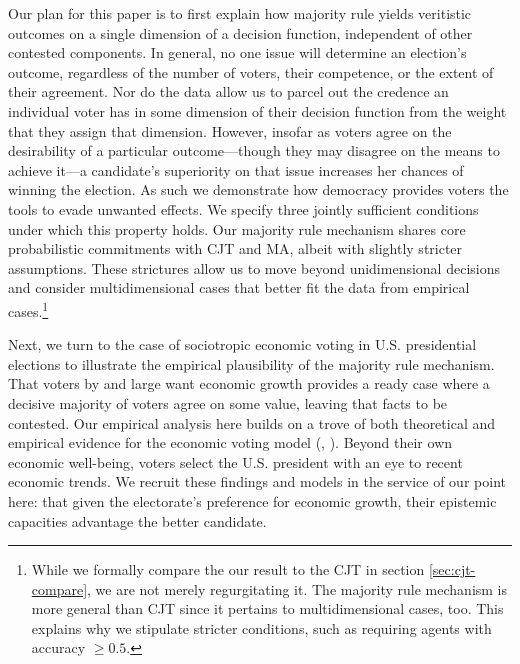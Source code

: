 \documentclass[11pt]{article}
\begin{document}
Our plan for this paper is to first explain how majority rule
yields veritistic outcomes on a single dimension of a decision
function, independent of other contested components.
In general, no one issue will determine an election's outcome, regardless of the number of voters, their competence, or the extent of their agreement. Nor do the data allow us to parcel out the credence an individual voter has in some dimension of their decision function from the weight that they assign that dimension. 
However, insofar as voters agree on the desirability of a particular outcome---though they may disagree on the means to achieve it---a candidate's superiority on that issue increases her chances of winning the election. As such we demonstrate how democracy provides voters the tools to evade unwanted effects. 
We specify three jointly sufficient conditions under which this property holds. 
Our majority rule mechanism shares  core probabilistic commitments with CJT and MA, albeit with slightly stricter assumptions. These strictures allow us to move beyond unidimensional decisions and consider multidimensional cases that better fit the data from empirical cases.\footnote{While we formally compare the our result to the CJT in section \ref{sec:cjt-compare}, we are not merely regurgitating it. The majority rule mechanism is more general than CJT since it pertains to multidimensional cases, too. This explains why we stipulate stricter conditions, such as requiring agents with accuracy $\ge 0.5$. }

Next, we turn to the case of sociotropic economic voting in U.S. presidential elections to illustrate the empirical plausibility of the majority rule mechanism. That voters by and large want economic growth provides a ready case where a decisive majority of voters agree on some value, leaving that facts to be contested.
 Our empirical analysis here builds on a trove of both theoretical and empirical evidence for the economic voting model (\cite{Duch2008}, \cite{Revisited09}). Beyond their own economic well-being, voters select the U.S. president with an eye to recent economic trends. We recruit these findings and models in the service of our point here: that given the electorate's preference for economic growth, their epistemic capacities advantage the better candidate.
 

\end{document}
